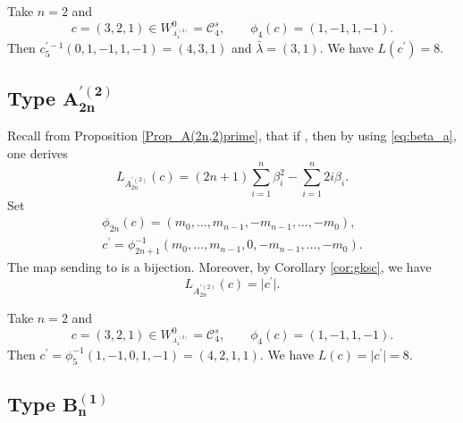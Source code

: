 \documentclass[10pt,a4paper]{amsart}
\numberwithin{equation}{section}
\newcommand{\cC}{\mathcal{C}}
\begin{document}
\begin{Example}
	Take $n=2$ and
\[
c=(3,2,1)\in W_{^{A_{4}^{\prime (2)}}}^{0}=\mathcal{C}%
	_{4}^{s},\qquad   \phi_{4}(c)=(1,-1,1,-1).
\] Then $c^{\prime
		-1}_{5}(0,1,-1,1,-1)=(4,3,1)$ and $\bar{\lambda}=(3,1)$. We have $	L(c^{\prime })=8$.
\end{Example}

\subsection[Type A\_\{2n\}\^{}\{'(2)\}]{Type $\boldsymbol{A_{2n}^{\prime (2)}}$}

Recall from Proposition \ref{Prop_A(2n,2)prime}, that if , then by using \eqref{eq:beta_a}, one derives
\begin{equation*}
L_{A_{2n}^{\prime (2)}}(c)=(2n+1)\sum_{i=1}^{n}\beta
_{i}^{2}-\sum_{i=1}^{n}2i\beta _{i}.
\end{equation*}
Set
\begin{gather*}
\phi _{2n}(c)=(m_{0},\dots ,m_{n-1},-m_{n-1},\dots ,-m_{0}),\\   c^{\prime }=\phi _{2n+1}^{-1}(m_{0},\dots ,m_{n-1},0,-m_{n-1},\dots ,-m_{0}).
\end{gather*}
The map sending \smash{$c\in \cC_{n}^{s}$} to \smash{$c^{\prime }\in \cC_{2n+1}^{s}$} is a bijection. Moreover, by Corollary \ref{cor:gksc}, we have
\begin{equation*}
L_{A_{2n}^{\prime (2)}}(c)=\lvert c^{\prime }\rvert.
\end{equation*}

\begin{Example}
	Take $n=2$ and
\[
c=(3,2,1)\in W_{^{A_{4}^{\prime (2)}}}^{0}=\mathcal{C}%
	_{4}^{s}, \qquad  \phi _{4}(c)=(1,-1,1,-1).
\] Then $c^{\prime }=\phi
	_{5}^{-1}(1,-1,0,1,-1)=(4,2,1,1)$. We have $L(c)=\vert c^{\prime
	} \vert =8$.
\end{Example}

%
%

\subsection[Type B\_n\^{}(1)]{Type $\boldsymbol{B_{n}^{(1)}}$}
\end{document}

